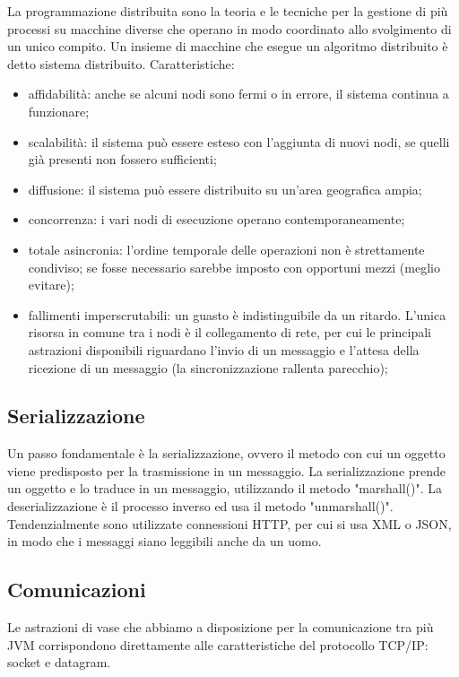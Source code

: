 \documentclass{article}
\begin{document}
La programmazione distribuita sono la teoria e le tecniche per la gestione di
più processi su macchine diverse che operano in modo coordinato allo svolgimento
di un unico compito. Un insieme di macchine che esegue un algoritmo distribuito
è detto sistema distribuito. Caratteristiche:
\begin{itemize}
	\item affidabilità: anche se alcuni nodi sono fermi o in errore, il
		sistema continua a funzionare;

	\item scalabilità: il sistema può essere esteso con l'aggiunta di nuovi
		nodi, se quelli già presenti non fossero sufficienti;

	\item diffusione: il sistema può essere distribuito su un'area geografica
		ampia;

	\item concorrenza: i vari nodi di esecuzione operano contemporaneamente;

	\item totale asincronia: l'ordine temporale delle operazioni non è
		strettamente condiviso; se fosse necessario sarebbe imposto con
		opportuni mezzi (meglio evitare);

	\item fallimenti imperscrutabili: un guasto è indistinguibile da un ritardo.
		L'unica risorsa in comune tra i nodi è il collegamento di rete, per cui
		le principali astrazioni disponibili riguardano l'invio di un messaggio
		e l'attesa della ricezione di un messaggio (la sincronizzazione rallenta
		parecchio);
\end{itemize}

\subsection{Serializzazione}
Un passo fondamentale è la serializzazione, ovvero il metodo con cui un oggetto
viene predisposto per la trasmissione in un messaggio. La serializzazione prende
un oggetto e lo traduce in un messaggio, utilizzando il metodo "marshall()".
La deserializzazione è il processo inverso ed usa il metodo "unmarshall()".\\
Tendenzialmente sono utilizzate connessioni HTTP, per cui si usa XML o JSON, in
modo che i messaggi siano leggibili anche da un uomo.\\

\subsection{Comunicazioni}
Le astrazioni di vase che abbiamo a disposizione per la comunicazione tra più
JVM corrispondono direttamente alle caratteristiche del protocollo TCP/IP:
socket e datagram.\\
\end{document}

